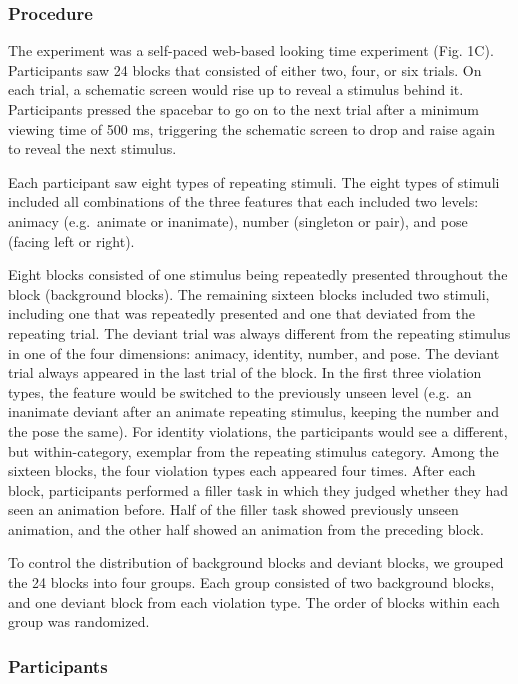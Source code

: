 \documentclass[10pt, letterpaper]{article}
\begin{document}
\hypertarget{procedure}{%
\subsubsection{Procedure}\label{procedure}}

The experiment was a self-paced web-based looking time experiment (Fig.
1C). Participants saw 24 blocks that consisted of either two, four, or
six trials. On each trial, a schematic screen would rise up to reveal a
stimulus behind it. Participants pressed the spacebar to go on to the
next trial after a minimum viewing time of 500 ms, triggering the
schematic screen to drop and raise again to reveal the next stimulus.

Each participant saw eight types of repeating stimuli. The eight types
of stimuli included all combinations of the three features that each
included two levels: animacy (e.g.~animate or inanimate), number
(singleton or pair), and pose (facing left or right).

Eight blocks consisted of one stimulus being repeatedly presented
throughout the block (background blocks). The remaining sixteen blocks
included two stimuli, including one that was repeatedly presented and
one that deviated from the repeating trial. The deviant trial was always
different from the repeating stimulus in one of the four dimensions:
animacy, identity, number, and pose. The deviant trial always appeared
in the last trial of the block. In the first three violation types, the
feature would be switched to the previously unseen level (e.g.~an
inanimate deviant after an animate repeating stimulus, keeping the
number and the pose the same). For identity violations, the participants
would see a different, but within-category, exemplar from the repeating
stimulus category. Among the sixteen blocks, the four violation types
each appeared four times. After each block, participants performed a
filler task in which they judged whether they had seen an animation
before. Half of the filler task showed previously unseen animation, and
the other half showed an animation from the preceding block.

To control the distribution of background blocks and deviant blocks, we
grouped the 24 blocks into four groups. Each group consisted of two
background blocks, and one deviant block from each violation type. The
order of blocks within each group was randomized.

\hypertarget{participants}{%
\subsubsection{Participants}\label{participants}}
\end{document}
